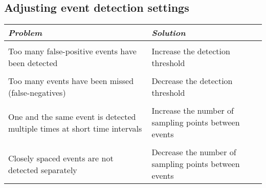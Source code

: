 \subsection{Adjusting event detection settings}
\small
\begin{tabular}{p{} p{}}
\textit{Problem} & \textit{Solution} \\ \hline 
 & \\
Too many false-positive events have been detected & Increase the detection threshold \\
 & \\
Too many events have been missed (false-negatives) & Decrease the detection threshold \\
 & \\
One and the same event is detected multiple times at short time intervals & Increase the number of sampling points between events \\
 & \\
Closely spaced events are not detected separately & Decrease the number of sampling points between events \\
\end{tabular}
